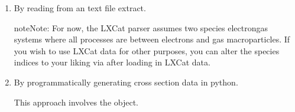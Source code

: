 \documentclass[letterpaper,10pt,english,openany,oneside]{sphinxmanual}
\begin{document}
\begin{enumerate}
%
\item {} 
\sphinxAtStartPar
By reading from an  text file extract.

\begin{sphinxVerbatim}[commandchars=\\\{\}]
   
  
\end{sphinxVerbatim}

\begin{sphinxadmonition}{note}{Note:}
\sphinxAtStartPar
For now, the LXCat parser assumes two species electron\sphinxhyphen{}gas
systems where all processes are between electrons and
gas macroparticles. If you wish to use LXCat data for other
purposes, you can alter the species indices to your liking
via  after loading in LXCat data.
\end{sphinxadmonition}

\item {} 
\sphinxAtStartPar
By programmatically generating cross section data in python.

\sphinxAtStartPar
This approach involves the {\hyperref[\detokenize{api/pytb.Process:pytb.Process}]{}} object.

\begin{sphinxVerbatim}[commandchars=\\\{\}]
   
   

  



\end{sphinxVerbatim}
\end{enumerate}
\end{document}
